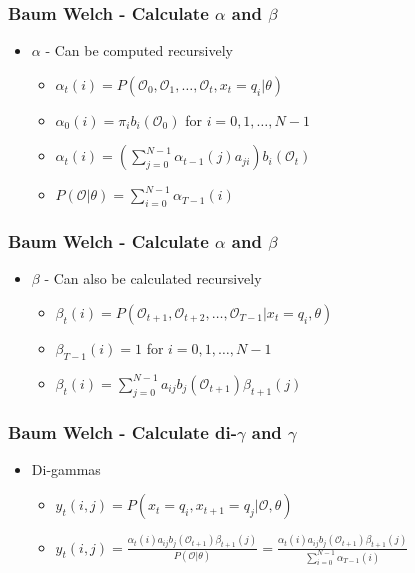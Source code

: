 \begin{frame}
	\frametitle{Baum Welch - Calculate $\alpha$ and $\beta$}
	\begin{itemize}
		\item $\alpha$ - Can be computed recursively
		\begin{itemize}
			\item $\alpha_t(i) = P(\mathcal{O}_0, \mathcal{O}_1, \dots ,\mathcal{O}_t , x_t = q_i | \theta)$
			\item $\alpha_0(i) = \pi_i b_i(\mathcal{O}_0)$ for $i = 0, 1, \dots, N-1$
			\item $\alpha_t(i) = \left(\sum\limits_{j=0}^{N-1} \alpha_{t-1}(j)a_{ji}\right)b_i(\mathcal{O}_t)$
			\item $P(\mathcal{O}|\theta) = \sum\limits_{i=0}^{N-1} \alpha_{T-1}(i)$
		\end{itemize}
	\end{itemize}
\end{frame}

\begin{frame}
	\frametitle{Baum Welch - Calculate $\alpha$ and $\beta$}
	\begin{itemize}
		\item $\beta$ - Can also be calculated recursively
		\begin{itemize}
			\item $\beta_t(i) = P(\mathcal{O}_{t+1}, \mathcal{O}_{t+2}, \dots, \mathcal{O}_{T-1} | x_t = q_i, \theta)$
			\item $\beta_{T-1}(i) = 1$ for $i = 0, 1, \dots, N-1$
			\item $\beta_t(i) = \sum\limits_{j=0}^{N-1} a_{ij} b_j(\mathcal{O}_{t+1}) \beta_{t+1}(j)$
		\end{itemize}
	\end{itemize}
\end{frame}

\begin{frame}
	\frametitle{Baum Welch - Calculate di-$\gamma$ and $\gamma$}
	\begin{itemize}
		\item Di-gammas
		\begin{itemize}
			\item $y_t(i,j) = P(x_t = q_i, x_{t+1} = q_j | \mathcal{O},\theta)$
			\item $y_t(i,j) = \frac{\alpha_t(i) a_{ij} b_j (\mathcal{O}_{t+1})\beta_{t+1}(j)}{P(\mathcal{O} | \theta)} = \frac{\alpha_t(i) a_{ij} b_j (\mathcal{O}_{t+1})\beta_{t+1}(j)}{\sum\limits_{i=0}^{N-1} \alpha_{T-1}(i)}$
		\end{itemize}
	\end{itemize}
\end{frame}

